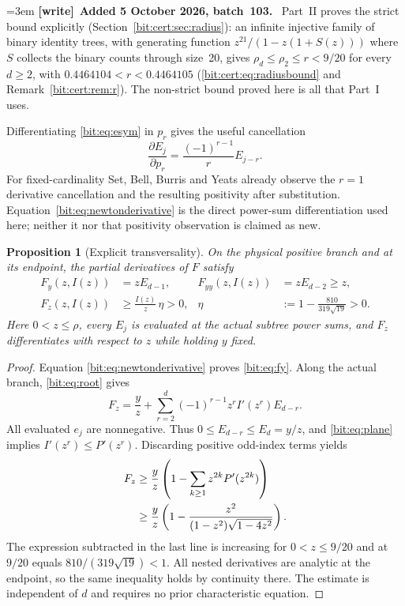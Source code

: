 \documentclass[11pt]{article}
\newtheorem{proposition}[theorem]{Proposition}
\theoremstyle{definition}\newtheorem{definition}[theorem]{Definition}
\theoremstyle{remark}\newtheorem{remark}[theorem]{Remark}
\newenvironment{writenote}[1][]{\par\smallskip\begingroup\small\emergencystretch=3em
 \noindent\textbf{[write]}\if\relax\detokenize{#1}\relax\else~\textbf{#1.}\fi\ }%
 {\par\endgroup\smallskip}
\begin{document}
\begin{writenote}[Added 5 October 2026, batch~103]
Part~II proves the strict bound explicitly
(Section~\ref{bit:cert:sec:radius}): an infinite injective family of binary
identity trees, with generating function $z^{21}/(1-z(1+S(z)))$ where $S$
collects the binary counts through size~20, gives
$\rho_d\le\rho_2\le r<9/20$ for every $d\ge2$, with $0.4464104<r<0.4464105$
(\eqref{bit:cert:eq:radiusbound} and Remark~\ref{bit:cert:rem:r}). The
non-strict bound proved here is all that Part~I uses.
\end{writenote}

Differentiating \eqref{bit:eq:esym} in $p_r$ gives the useful cancellation
\begin{equation}
 \frac{\partial E_j}{\partial p_r}=
 \frac{(-1)^{r-1}}r E_{j-r}.
 \label{bit:eq:newtonderivative}
\end{equation}
For fixed-cardinality Set, Bell, Burris and Yeats \cite[p.~57]{bby} already observe the $r=1$ derivative cancellation and the resulting positivity after substitution. Equation~\eqref{bit:eq:newtonderivative} is the direct power-sum differentiation used here; neither it nor that positivity observation is claimed as new.

\begin{proposition}[Explicit transversality]
\label{bit:prop:transverse}
On the physical positive branch and at its endpoint, the partial derivatives of $F$ satisfy
\begin{align}
 F_y(z,I(z))&=zE_{d-1},& F_{yy}(z,I(z))&=zE_{d-2}\ge z,\label{bit:eq:fy}\\
 F_z(z,I(z))&\ge\frac{I(z)}z\,\eta>0,&
 \eta&:=1-\frac{810}{319\sqrt{19}}>0.
 \label{bit:eq:fzbound}
\end{align}
Here $0<z\le\rho$, every $E_j$ is evaluated at the actual subtree power sums, and $F_z$ differentiates with respect to $z$ while holding $y$ fixed.
\end{proposition}
\begin{proof}
Equation \eqref{bit:eq:newtonderivative} proves \eqref{bit:eq:fy}. Along the actual branch, \eqref{bit:eq:root} gives
\begin{equation}
 F_z=\frac{y}{z}
   +\sum_{r=2}^d(-1)^{r-1}z^r I'(z^r)E_{d-r}.
 \label{bit:eq:fzexact}
\end{equation}
All evaluated $e_j$ are nonnegative. Thus
$0\le E_{d-r}\le E_d=y/z$, and \eqref{bit:eq:plane} implies
$I'(z^r)\le P'(z^r)$. Discarding positive odd-index terms yields
\begin{align}
 F_z&\ge\frac yz\left(1-\sum_{k\ge1}z^{2k}P'(z^{2k})\right)\notag\\
 &\ge\frac yz\left(1-\frac{z^2}{(1-z^2)\sqrt{1-4z^2}}\right).
 \label{bit:eq:fzchain}
\end{align}
The expression subtracted in the last line is increasing for $0<z\le9/20$ and at $9/20$ equals $810/(319\sqrt{19})<1$. All nested derivatives are analytic at the endpoint, so the same inequality holds by continuity there. The estimate is independent of $d$ and requires no prior characteristic equation.
\end{proof}
\end{document}

